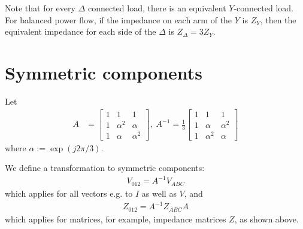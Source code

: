 \documentclass[10pt]{article}
\begin{document}
Note that for every $\Delta$ connected load, there is an equivalent $Y$-connected load. For balanced power flow, if the impedance on each arm of the $Y$ is $Z_Y$, then the equivalent impedance for each side of the $\Delta$ is $Z_\Delta = 3Z_Y$.

\section{Symmetric components}
Let 
\begin{align}
	A &= \left[
		\begin{array}{lll}
			1 & 1 & 1 \\
			1 & \alpha^2 & \alpha \\
			1 & \alpha & \alpha^2
		\end{array}
	\right],\;
	A^{-1} = \frac{1}{3}\left[
		\begin{array}{lll}
			1 & 1 & 1 \\
			1 & \alpha & \alpha^2 \\
			1 & \alpha^2 & \alpha
		\end{array}
	\right]
\end{align}
where $\alpha := \exp(j2\pi/3)$.

We define a transformation to symmetric components:
\begin{align}
	V_{012} = A^{-1}V_{ABC}
\end{align}
which applies for all vectors e.g. to $I$ as well as $V$, and
\begin{align}
	Z_{012} = A^{-1}Z_{ABC}A
\end{align}
which applies for matrices, for example, impedance matrices $Z$, as shown above.
\end{document}
